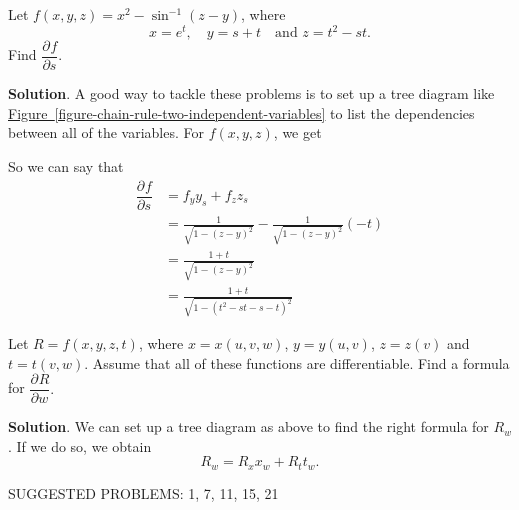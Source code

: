\documentclass[10pt,]{book}
\theoremstyle{ptxplainnotitle}
\theoremstyle{ptxplaintitle}
\theoremstyle{ptxplainnotitle}
\theoremstyle{ptxplaintitle}
\theoremstyle{ptxplainnotitle}
\theoremstyle{ptxplaintitle}
\theoremstyle{ptxdefinitionnotitle}
\theoremstyle{ptxdefinitiontitle}
\theoremstyle{ptxdefinitionnotitle}
\theoremstyle{ptxdefinitiontitle}
\theoremstyle{ptxdefinitionnotitle}
\theoremstyle{ptxdefinitiontitle}
\theoremstyle{ptxdefinitionnotitle}
\theoremstyle{ptxdefinitiontitle}
\theoremstyle{ptxdefinitionnotitle}
\theoremstyle{ptxdefinitiontitle}
\numberwithin{equation}{section}
\newcommand{\pdv}[3][]{\dfrac{\partial^{#1} #2}{\partial #3^{#1}}}
\begin{document}
\begin{example}\label{example-}
\hypertarget{p-1047}{}%
Let \(f(x,y,z) = x^{2} - \sin^{-1}(z-y)\), where%
\begin{equation*}
x = e^{t}, \quad y = s + t\quad\text{and } z = t^{2} - st.
\end{equation*}
Find \(\pdv{f}{s}\).%
\par\smallskip%
\noindent\textbf{Solution}.\hypertarget{solution-163}{}\quad%
\hypertarget{p-1048}{}%
A good way to tackle these problems is to set up a tree diagram like \hyperref[figure-chain-rule-two-independent-variables]{Figure~\ref{figure-chain-rule-two-independent-variables}} to list the dependencies between all of the variables. For \(f(x,y,z)\), we get \begin{figure}
\centering
{
}
\end{figure}
 So we can say that%
\begin{align*}
\pdv{f}{s} & = f_{y}y_{s} + f_{z}z_{s} \\
& = \frac{1}{\sqrt{1 - (z - y)^{2}}} - \frac{1}{\sqrt{1 - (z - y)^{2}}}(-t) \\
& = \frac{1 + t}{\sqrt{1 - (z - y)^{2}}} \\
& = \frac{1 + t}{\sqrt{1 - (t^{2} - st - s - t)^{2}}} 
\end{align*}
%
\end{example}
\begin{example}\label{example-chain-rule-from-a-tree-diagram}
\hypertarget{p-1049}{}%
Let \(R = f(x,y,z,t)\), where \(x = x(u,v,w)\), \(y = y(u, v)\), \(z = z(v)\) and \(t = t(v,w)\). Assume that all of these functions are differentiable. Find a formula for \(\pdv{R}{w}.\)%
\par\smallskip%
\noindent\textbf{Solution}.\hypertarget{solution-164}{}\quad%
\hypertarget{p-1050}{}%
We can set up a tree diagram as above to find the right formula for \(R_{w}\). If we do so, we obtain%
\begin{equation*}
R_{w} = R_{x}x_{w} + R_{t}t_{w}.
\end{equation*}
%
\end{example}
\hypertarget{p-1051}{}%
SUGGESTED PROBLEMS: 1, 7, 11, 15, 21%
\typeout{************************************************}
\typeout{************************************************}
\end{document}
